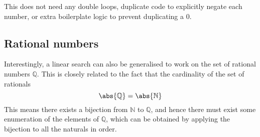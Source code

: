 \documentclass[fleqn,a4paper,11pt]{article}
\begin{document}
    This does not need any double loops, duplicate code to explicitly negate
    each number, or extra boilerplate logic to prevent duplicating a 0.

    \subsection{Rational numbers}

    Interestingly, a linear search can also be generalised to work on the set of
    rational numbers \(\mathbb{Q}\). This is closely related to the fact that the
    cardinality of the set of rationals
    \begin{equation}
        \abs{\mathbb{Q}} = \abs{\mathbb{N}}
    \end{equation}
    This means there exists a bijection from \(\mathbb{N}\) to \(\mathbb{Q}\), and
    hence there must exist some enumeration of the elements of \(\mathbb{Q}\),
    which can be obtained by applying the bijection to all the naturals in
    order.
\end{document}
